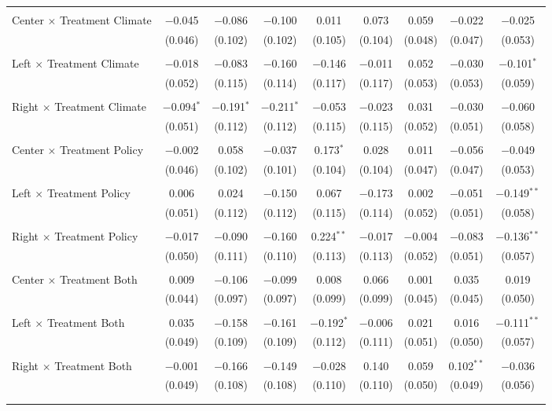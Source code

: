 \begin{tabular}{@{\extracolsep{5pt}}lcccccccc}
  & & & & & & & & \\ 
 Center $\times$ Treatment Climate & $-$0.045 & $-$0.086 & $-$0.100 & 0.011 & 0.073 & 0.059 & $-$0.022 & $-$0.025 \\ 
  & (0.046) & (0.102) & (0.102) & (0.105) & (0.104) & (0.048) & (0.047) & (0.053) \\ 
  & & & & & & & & \\ 
 Left $\times$ Treatment Climate & $-$0.018 & $-$0.083 & $-$0.160 & $-$0.146 & $-$0.011 & 0.052 & $-$0.030 & $-$0.101$^{*}$ \\ 
  & (0.052) & (0.115) & (0.114) & (0.117) & (0.117) & (0.053) & (0.053) & (0.059) \\ 
  & & & & & & & & \\ 
 Right $\times$ Treatment Climate & $-$0.094$^{*}$ & $-$0.191$^{*}$ & $-$0.211$^{*}$ & $-$0.053 & $-$0.023 & 0.031 & $-$0.030 & $-$0.060 \\ 
  & (0.051) & (0.112) & (0.112) & (0.115) & (0.115) & (0.052) & (0.051) & (0.058) \\ 
  & & & & & & & & \\ 
 Center $\times$ Treatment Policy & $-$0.002 & 0.058 & $-$0.037 & 0.173$^{*}$ & 0.028 & 0.011 & $-$0.056 & $-$0.049 \\ 
  & (0.046) & (0.102) & (0.101) & (0.104) & (0.104) & (0.047) & (0.047) & (0.053) \\ 
  & & & & & & & & \\ 
 Left $\times$ Treatment Policy & 0.006 & 0.024 & $-$0.150 & 0.067 & $-$0.173 & 0.002 & $-$0.051 & $-$0.149$^{**}$ \\ 
  & (0.051) & (0.112) & (0.112) & (0.115) & (0.114) & (0.052) & (0.051) & (0.058) \\ 
  & & & & & & & & \\ 
 Right $\times$ Treatment Policy & $-$0.017 & $-$0.090 & $-$0.160 & 0.224$^{**}$ & $-$0.017 & $-$0.004 & $-$0.083 & $-$0.136$^{**}$ \\ 
  & (0.050) & (0.111) & (0.110) & (0.113) & (0.113) & (0.052) & (0.051) & (0.057) \\ 
  & & & & & & & & \\ 
 Center $\times$ Treatment Both & 0.009 & $-$0.106 & $-$0.099 & 0.008 & 0.066 & 0.001 & 0.035 & 0.019 \\ 
  & (0.044) & (0.097) & (0.097) & (0.099) & (0.099) & (0.045) & (0.045) & (0.050) \\ 
  & & & & & & & & \\ 
 Left $\times$ Treatment Both & 0.035 & $-$0.158 & $-$0.161 & $-$0.192$^{*}$ & $-$0.006 & 0.021 & 0.016 & $-$0.111$^{**}$ \\ 
  & (0.049) & (0.109) & (0.109) & (0.112) & (0.111) & (0.051) & (0.050) & (0.057) \\ 
  & & & & & & & & \\ 
 Right $\times$ Treatment Both & $-$0.001 & $-$0.166 & $-$0.149 & $-$0.028 & 0.140 & 0.059 & 0.102$^{**}$ & $-$0.036 \\ 
  & (0.049) & (0.108) & (0.108) & (0.110) & (0.110) & (0.050) & (0.049) & (0.056) \\ 
  & & & & & & & & \\ 
\hline \\[-1.8ex] 


\end{tabular}
